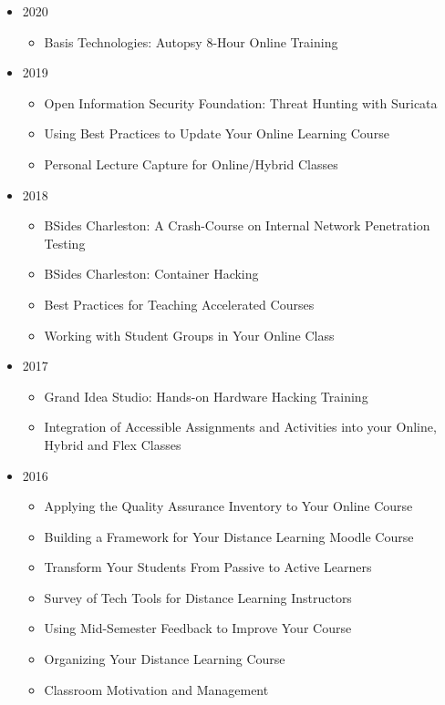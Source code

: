 \documentclass[letterpaper,11pt]{article}
\begin{document}
\begin{itemize}
\item 2020
\begin{itemize}
    \item Basis Technologies: Autopsy 8-Hour Online Training
\end{itemize}
	\item 2019
	\begin{itemize}
	    \item Open Information Security Foundation: Threat Hunting with Suricata
	    \item Using Best Practices to Update Your Online Learning Course
	    \item Personal Lecture Capture for Online/Hybrid Classes
	\end{itemize}
	\item 2018
	\begin{itemize}
	    \item BSides Charleston: A Crash-Course on Internal Network Penetration Testing
	    \item BSides Charleston: Container Hacking
	    \item Best Practices for Teaching Accelerated Courses
	    \item Working with Student Groups in Your Online Class
	\end{itemize}
	\item 2017
	\begin{itemize}
		\item Grand Idea Studio: Hands-on Hardware Hacking Training
		\item Integration of Accessible Assignments and Activities into your Online, Hybrid and Flex Classes
	\end{itemize}
	\item 2016
	\begin{itemize}
	    \item  Applying the Quality Assurance Inventory to Your Online Course
	    \item  Building a Framework for Your Distance Learning Moodle Course
	    \item  Transform Your Students From Passive to Active Learners
	    \item  Survey of Tech Tools for Distance Learning Instructors
	    \item  Using Mid-Semester Feedback to Improve Your Course
	    \item  Organizing Your Distance Learning Course
	    \item  Classroom Motivation and Management

\end{itemize}
\end{itemize}
\end{document}
